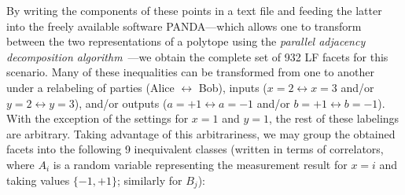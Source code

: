 \documentclass[aps,prx,twocolumn,superscriptaddress]{revtex4-1}
\theoremstyle{plain}
\begin{document}
By writing the components of these points in a text file and feeding the latter into the freely available software PANDA---which allows one to transform between the two representations of a polytope using the {\em parallel adjacency decomposition algorithm}~\cite{PANDA}---we obtain the complete set of 932 LF facets for this scenario. Many of these inequalities can be transformed from one to another under a relabeling of parties (Alice $\leftrightarrow$ Bob), inputs ($x=2\leftrightarrow x=3$ and/or $y=2\leftrightarrow y=3$), and/or outputs ($a=+1\leftrightarrow a=-1$ and/or $b=+1\leftrightarrow b=-1$).  With the exception of the settings for $x=1$ and $y=1$, the rest of these labelings are arbitrary. Taking advantage of this arbitrariness, we may group the obtained facets into the following 9 inequivalent classes (written in terms of correlators, where $A_i$ is a random variable representing the measurement result for $x=i$ and taking values $\{-1,+1\}$; similarly for $B_j$):
\end{document}
